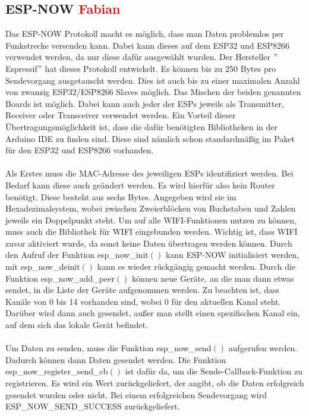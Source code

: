 \documentclass[titlepage,12pt,twoside]{article}
\begin{document}
\subsection{ESP-NOW \textcolor{red}{Fabian}}
\label{chap:ESP-NOW}
Das ESP-NOW Protokoll macht es möglich, dass man Daten problemlos per 
Funkstrecke versenden kann. Dabei kann dieses auf dem ESP32 und ESP8266 
verwendet werden, da nur diese dafür ausgewählt wurden. Der Hersteller 
$"$Espressif$"$ hat dieses Protokoll entwickelt. Es können bis zu 250 Bytes 
pro Sendevorgang ausgetauscht werden. Dies ist auch bis zu einer maximalen Anzahl 
von zwanzig ESP32/ESP8266 Slaves möglich. Das Mischen der beiden genannten 
Boards ist möglich. Dabei kann auch jeder der ESPs jeweils als Transmitter, 
Receiver oder Transceiver verwendet werden. Ein Vorteil dieser Übertragungsmöglichkeit 
ist, dass die dafür benötigten Bibliotheken in der Arduino IDE zu finden 
sind. Diese sind nämlich schon standardmäßig im Paket für den ESP32 und 
ESP8266 vorhanden. \\
\\
Als Erstes muss die MAC-Adresse des jeweiligen ESPs identifiziert werden. 
Bei Bedarf kann diese auch geändert werden. Es wird hierfür also kein 
Router benötigt. Diese besteht aus sechs Bytes. Angegeben wird sie im 
Hexadezimalsystem, wobei zwischen Zweierblöcken von Buchstaben und Zahlen 
jeweils ein Doppelpunkt steht. Um auf alle WIFI-Funktionen nutzen zu können, 
muss auch die Bibliothek für WIFI eingebunden werden. Wichtig ist, dass WIFI 
zuvor aktiviert wurde, da sonst keine Daten übertragen werden können. Durch 
den Aufruf der Funktion esp\_now\_init$()$ kann ESP-NOW initialisiert werden, 
mit esp\_now\_deinit$()$ kann es wieder rückgängig gemacht werden. Durch die 
Funktion esp\_now\_add\_peer$()$ können neue Geräte, an die man dann etwas sendet, 
in die Liste der Geräte aufgenommen werden. Zu beachten ist, dass Kanäle von 0 bis 14 vorhanden 
sind, wobei 0 für den aktuellen Kanal steht. Darüber wird dann auch gesendet, 
außer man stellt einen spezifischen Kanal ein, auf dem sich das lokale Gerät 
befindet. \\
\\
Um Daten zu senden, muss die Funktion esp\_now\_send$()$ aufgerufen werden. 
Dadurch können dann Daten gesendet werden. Die Funktion esp\_now\_register\_send\_cb$()$ 
ist dafür da, um die Sende-Callback-Funktion zu registrieren. Es wird ein 
Wert zurückgeliefert, der angibt, ob die Daten erfolgreich gesendet wurden oder 
nicht. Bei einem erfolgreichen Sendevorgang wird ESP\_NOW\_SEND\_SUCCESS zurückgeliefert. 
\end{document}
